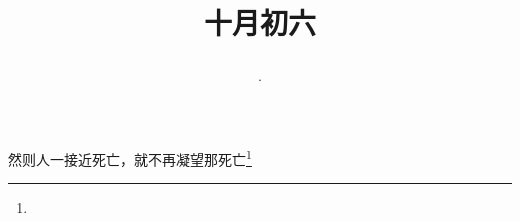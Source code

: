 \title{\date[d=6,m=11,y=2024][year:cn-y,年,month:cn,day:cn,日,·,weekday]·十月初六 }
然则人一接近死亡，就不再凝望那死亡\footnote{ }

